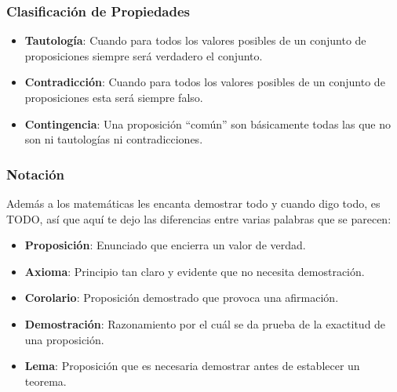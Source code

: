 \documentclass[12pt]{report}                                    %
\begin{document}
            \subsubsection*{Clasificación de Propiedades}

                \begin{itemize}
                    \item \textbf{Tautología}: Cuando para todos los valores posibles de un conjunto
                            de proposiciones siempre será verdadero el conjunto.

                    \item \textbf{Contradicción}: Cuando para todos los valores posibles de un conjunto
                    de proposiciones esta será siempre falso.

                    \item \textbf{Contingencia}: Una proposición “común” son básicamente todas las que
                    no son ni tautologías ni contradicciones.
                \end{itemize}

            \subsubsection*{Notación}

                Además a los matemáticas les encanta demostrar todo y cuando digo todo, es TODO, así que
                aquí te dejo las diferencias entre varias palabras que se parecen:

                \begin{itemize}
                    \item \textbf{Proposición}: Enunciado que encierra un valor de verdad.

                    \item \textbf{Axioma}: Principio tan claro y evidente que no necesita demostración.

                    \item \textbf{Corolario}: Proposición demostrado que provoca una afirmación.

                    \item \textbf{Demostración}: Razonamiento por el cuál se da prueba de la
                        exactitud de una proposición.

                    \item \textbf{Lema}: Proposición que es necesaria demostrar antes de
                    establecer un teorema.

                \end{itemize}
\end{document}
